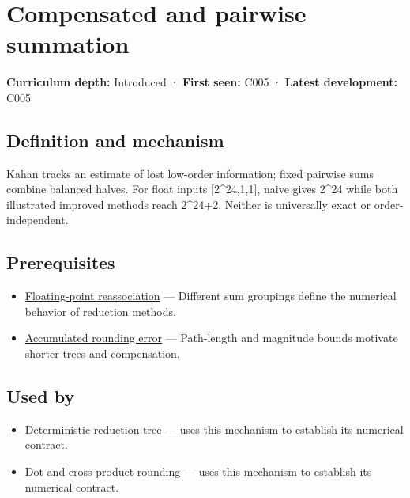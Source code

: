 \hypertarget{appendix-df318da57389}{}\label{referencestart:appendix-df318da57389}
\section{Compensated and pairwise summation}\label{appendix-df318da57389-compensated-and-pairwise-summation}

\textbf{Curriculum depth:} Introduced · \textbf{First seen:} C005 · \textbf{Latest development:} C005

\subsection{Definition and mechanism}\label{appendix-df318da57389-definition-and-mechanism}

Kahan tracks an estimate of lost low-order information; fixed pairwise sums combine balanced halves. For float inputs {[}2\^{}24,1,1{]}, naive gives 2\^{}24 while both illustrated improved methods reach 2\^{}24+2. Neither is universally exact or order-independent.

\subsection{Prerequisites}\label{appendix-df318da57389-prerequisites}

\begin{itemize}
\tightlist
\item
  \hyperref[appendix-c2ac4a84c283]{Floating-point reassociation} --- Different sum groupings define the numerical behavior of reduction methods.
\item
  \hyperref[appendix-f82e270791c8]{Accumulated rounding error} --- Path-length and magnitude bounds motivate shorter trees and compensation.
\end{itemize}

\subsection{Used by}\label{appendix-df318da57389-used-by}

\begin{itemize}
\tightlist
\item
  \hyperref[appendix-4c8e0238e7ee]{Deterministic reduction tree} --- uses this mechanism to establish its numerical contract.
\item
  \hyperref[appendix-5aef4f13483a]{Dot and cross-product rounding} --- uses this mechanism to establish its numerical contract.
\end{itemize}

